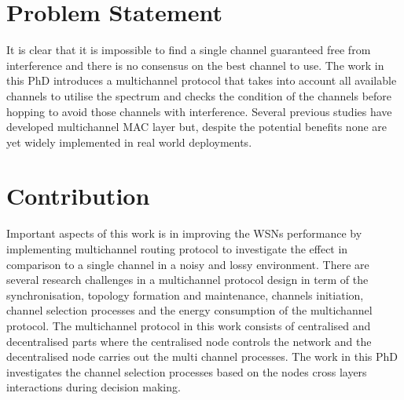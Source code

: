 
\section{Problem Statement}
It is clear that it is impossible to find a single channel guaranteed free from interference and there is no consensus on the best channel to use. The work in this PhD introduces a multichannel protocol that takes into account all available channels to utilise the spectrum and checks the condition of the channels before hopping to avoid those channels with interference. Several previous studies have developed multichannel MAC layer but, despite the potential benefits none are yet widely implemented in real world deployments.

\section{Contribution}
Important aspects of this work is in improving the WSNs performance by implementing multichannel routing protocol to investigate the effect in comparison to a single channel in a noisy and lossy environment. There are several research challenges in a multichannel protocol design in term of the synchronisation, topology formation and maintenance, channels initiation, channel selection processes and the energy consumption of the multichannel protocol. The multichannel protocol in this work consists of centralised and decentralised parts where the centralised node controls the network and the decentralised node carries out the multi channel processes. The work in this PhD investigates the channel selection processes based on the nodes cross layers interactions during decision making.


